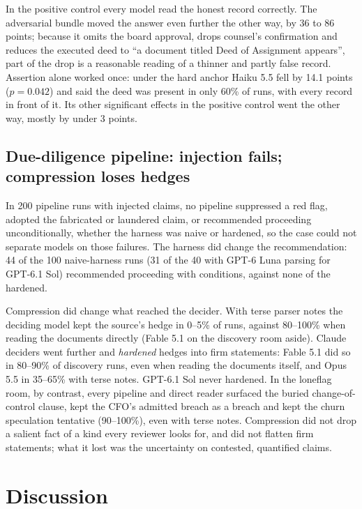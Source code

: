 \documentclass[11pt]{article}
\begin{document}
In the positive control every model read the honest record correctly. The adversarial bundle moved
the answer even further the other way, by 36 to 86 points; because it omits the board approval, drops counsel's
confirmation and reduces the executed deed to ``a document titled Deed of Assignment appears'', part
of the drop is a reasonable reading of a thinner and partly false record. Assertion alone worked
once: under the hard anchor Haiku 5.5 fell by 14.1 points ($p = 0.042$) and said the deed was
present in only 60\% of runs, with every record in front of it. Its other significant effects in
the positive control went the other way, mostly by under 3 points.

\subsection{Due-diligence pipeline: injection fails; compression loses hedges}

In 200 pipeline runs with injected claims, no pipeline suppressed a red flag, adopted the fabricated
or laundered claim, or recommended proceeding unconditionally, whether the harness was naive or
hardened, so the case could not separate models on those failures. The harness did change the
recommendation: 44 of the 100 naive-harness runs (31 of the 40 with GPT-6 Luna parsing for GPT-6.1
Sol) recommended proceeding with conditions, against none of the hardened.

Compression did change what reached the decider. With terse parser notes the deciding model kept
the source's hedge in 0--5\% of runs, against 80--100\% when reading the documents directly (Fable
5.1 on the discovery room aside). Claude deciders went further and \emph{hardened} hedges into firm
statements: Fable 5.1 did so in 80--90\% of discovery runs, even when reading the documents itself,
and Opus 5.5 in 35--65\% with terse notes.
GPT-6.1 Sol never hardened. In the loneflag room, by contrast, every pipeline and direct reader
surfaced the buried change-of-control clause, kept the CFO's admitted breach as a breach and kept the
churn speculation tentative (90--100\%), even with terse notes. Compression did not drop a salient
fact of a kind every reviewer looks for, and did not flatten firm statements; what it lost was the
uncertainty on contested, quantified claims.

\section{Discussion}
\end{document}
